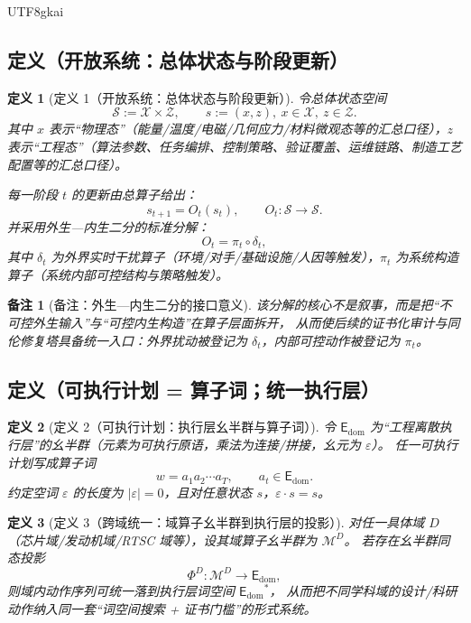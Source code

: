 \documentclass[12pt]{article}
\newtheorem{definition}{定义}[section]
\newtheorem{remark}{备注}[section]
\newcommand{\EDOM}{\ensuremath{\mathsf{E}_{\mathrm{dom}}}}
\begin{document}
\begin{CJK*}{UTF8}{gkai}
\subsection{定义（开放系统：总体状态与阶段更新）}
\label{subsec:tex25-def-state-update}

\begin{definition}[定义 1（开放系统：总体状态与阶段更新）]
令总体状态空间
\[
  \mathcal{S}:=\mathcal{X}\times\mathcal{Z},\qquad s:=(x,z),\ x\in\mathcal{X},\ z\in\mathcal{Z}.
\]
其中 $x$ 表示“物理态”（能量/温度/电磁/几何应力/材料微观态等的汇总口径），$z$ 表示“工程态”（算法参数、任务编排、控制策略、验证覆盖、运维链路、制造工艺配置等的汇总口径）。

每一阶段 $t$ 的更新由总算子给出：
\[
  s_{t+1}=O_t(s_t),\qquad O_t:\mathcal{S}\to\mathcal{S}.
\]
并采用外生—内生二分的标准分解：
\[
  O_t=\pi_t\circ\delta_t,
\]
其中 $\delta_t$ 为外界实时干扰算子（环境/对手/基础设施/人因等触发），$\pi_t$ 为系统构造算子（系统内部可控结构与策略触发）。
\end{definition}

\begin{remark}[备注：外生—内生二分的接口意义]
该分解的核心不是叙事，而是把“不可控外生输入”与“可控内生构造”在算子层面拆开，
从而使后续的证书化审计与同伦修复塔具备统一入口：外界扰动被登记为 $\delta_t$，内部可控动作被登记为 $\pi_t$。
\end{remark}

\subsection{定义（可执行计划 = 算子词；统一执行层）}
\label{subsec:tex25-def-word}

\begin{definition}[定义 2（可执行计划：执行层幺半群与算子词）]
令 $\EDOM$ 为“工程离散执行层”的幺半群（元素为可执行原语，乘法为连接/拼接，幺元为 $\varepsilon$）。
任一可执行计划写成算子词
\[
  w=a_1a_2\cdots a_T,\qquad a_t\in\EDOM.
\]
约定空词 $\varepsilon$ 的长度为 $|\varepsilon|=0$，且对任意状态 $s$，$\varepsilon\cdot s=s$。
\end{definition}

\begin{definition}[定义 3（跨域统一：域算子幺半群到执行层的投影）]
对任一具体域 $D$（芯片域/发动机域/RTSC 域等），设其域算子幺半群为 $\mathcal{M}^{D}$。
若存在幺半群同态投影
\[
  \Phi^{D}:\mathcal{M}^{D}\to \EDOM,
\]
则域内动作序列可统一落到执行层词空间 $\EDOM^{\ast}$，
从而把不同学科域的设计/科研动作纳入同一套“词空间搜索 + 证书门槛”的形式系统。
\end{definition}


\end{CJK*}
\end{document}
